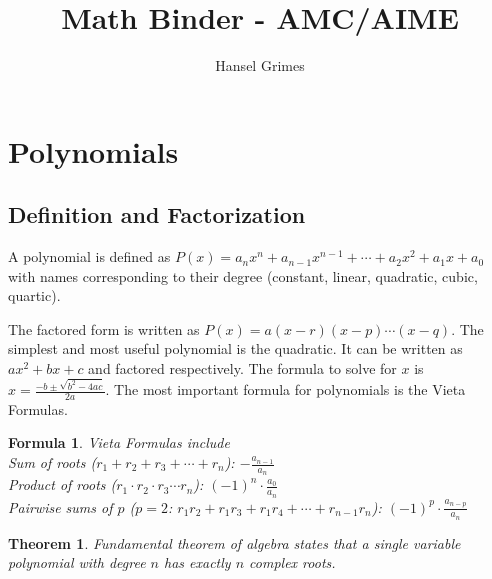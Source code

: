 \documentclass[12pt, a4paper]{article}
\title{\textbf{Math Binder - AMC/AIME}}
\author{Hansel Grimes}
\newtheorem{theorem}{Theorem}
\newtheorem{formula}{Formula}
\begin{document}
  \maketitle
  \tableofcontents

  \newpage

  \section{Polynomials}
  \subsection{Definition and Factorization}
  A polynomial is defined as $P(x) = a_nx^n + a_{n-1}x^{n-1} + \cdots + a_2x^2 + a_1x + a_0$ 
  with names corresponding to their degree (constant, linear, quadratic, cubic, quartic).
  
  The factored form is written as $P(x) = a(x-r)(x-p)\cdots(x-q)$.
  The simplest and most useful polynomial is the quadratic. It can be written as $ax^2+bx+c$ and factored respectively.
  The formula to solve for $x$ is $x=\frac{-b \pm \sqrt{b^2 - 4ac}}{2a}$. 
  The most important formula for polynomials is the Vieta Formulas.

  \begin{formula}
    Vieta Formulas include \\
    Sum of roots ($r_1+r_2+r_3+\cdots+r_n$): $-\frac{a_{n-1}}{a_{n}}$ \\
    Product of roots ($r_1 \cdot r_2 \cdot r_3 \cdots r_n$): $(-1)^n \cdot \frac{a_0}{a_n}$ \\
    Pairwise sums of $p$  ($p=2$: $r_1r_2+r_1r_3+r_1r_4+\cdots+r_{n-1}r_n$): $(-1)^p \cdot \frac{a_{n - p}}{a_{n}}$
  \end{formula}


  \begin{theorem}
    Fundamental theorem of algebra states that a single variable polynomial with degree
    $n$ has exactly $n$ complex roots.
  \end{theorem}
\end{document}
